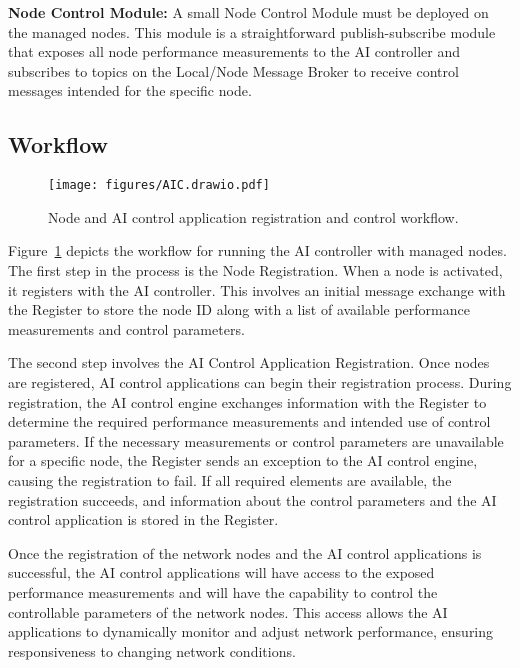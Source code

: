 \textbf{Node Control Module:}
A small Node Control Module must be deployed on the managed nodes. This module is a straightforward publish-subscribe module that exposes all node performance measurements to the AI controller and subscribes to topics on the Local/Node Message Broker to receive control messages intended for the specific node.
\vspace{-1em}

\subsection{Workflow}
\begin{figure}[tp]
\centering
\texttt{[image: figures/AIC.drawio.pdf]}
\caption{Node and AI control application registration and control workflow.}\label{fig:registration_and_control}\vspace{-1.2em}
\end{figure}

Figure~\ref{fig:registration_and_control} depicts the workflow for running the AI controller with managed nodes. The first step in the process is the Node Registration. When a node is activated, it registers with the AI controller. This involves an initial message exchange with the Register to store the node ID along with a list of available performance measurements and control parameters.

The second step involves the AI Control Application Registration. Once nodes are registered, AI control applications can begin their registration process. During registration, the AI control engine exchanges information with the Register to determine the required performance measurements and intended use of control parameters. If the necessary measurements or control parameters are unavailable for a specific node, the Register sends an exception to the AI control engine, causing the registration to fail. If all required elements are available, the registration succeeds, and information about the control parameters and the AI control application is stored in the Register.

Once the registration of the network nodes and the AI control applications is successful, the AI control applications will have access to the exposed performance measurements and will have the capability to control the controllable parameters of the network nodes. This access allows the AI applications to dynamically monitor and adjust network performance, ensuring responsiveness to changing network conditions.

